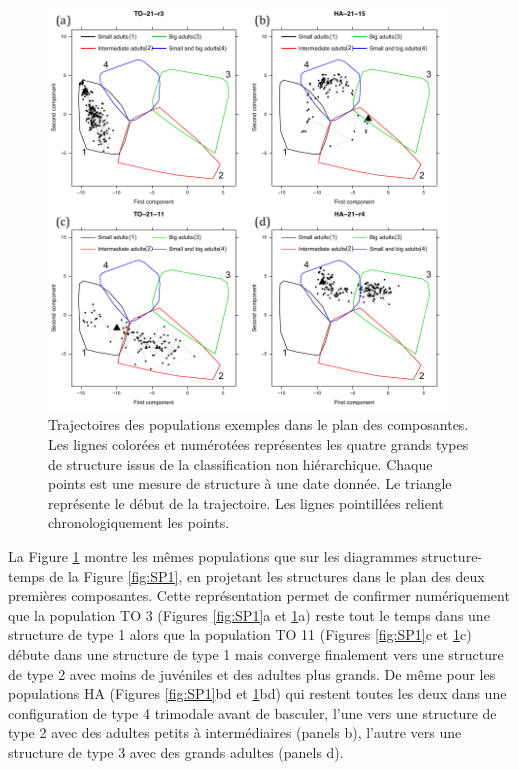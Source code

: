 \begin{figure}[!ht]
\begin{center}
\includegraphics[width=0.95\textwidth]{1_CorpsDeThese/Resumes/Fig/SP04}
\caption[Trajectoires des
popualtions exemple dans le plan des composantes]{Trajectoires des
populations exemples dans le plan des composantes. Les lignes colorées et
numérotées représentes les quatre grands types de structure issus de la
classification non hiérarchique. Chaque points est une mesure de structure à
une date donnée. Le triangle représente le début de la trajectoire. Les lignes
pointillées relient chronologiquement les points.}
\label{fig:SP4}
\end{center}
\end{figure}

La Figure \ref{fig:SP4} montre les mêmes populations que sur les diagrammes
structure-temps de la Figure \ref{fig:SP1}, en projetant les structures dans le
plan des deux premières composantes. Cette représentation permet de confirmer
numériquement que la population TO 3 (Figures \ref{fig:SP1}a et \ref{fig:SP4}a)
reste tout le temps dans une structure de type 1 alors que la population TO 11
(Figures \ref{fig:SP1}c et \ref{fig:SP4}c) débute dans une structure de type 1
mais converge finalement vers une structure de type 2 avec moins de juvéniles et
des adultes plus grands. De même pour les populations HA  (Figures
\ref{fig:SP1}bd et \ref{fig:SP4}bd) qui restent toutes les deux dans une
configuration de type 4 trimodale avant de basculer, l'une vers une structure de
type 2 avec des adultes petits à intermédiaires (panels b), l'autre vers une
structure de type 3 avec des grands adultes (panels d).

